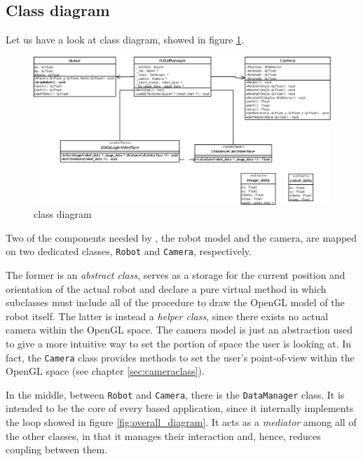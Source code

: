 \subsection{Class diagram}
\label{sec:classdiagram}
%
Let us have a look at \framework{} class diagram, 
showed in figure \ref {fig:class_diagram}.
%
\begin{figure}[!h]
  \begin{center}
    \includegraphics[width=400pt]{img/rear_class_diagram.png}
    \caption{\framework{} class diagram}
    \label{fig:class_diagram}
  \end{center}
\end{figure}
%
Two of the components needed by \framework{}, the robot 
model and the camera, are mapped on two dedicated classes, 
\texttt{Robot} and \texttt{Camera}, respectively.
%

%
The former is an \textit{abstract class}, serves as a storage 
for the current position and orientation of the actual
robot and declare a pure virtual method in which subclasses 
must include all of the procedure to draw the OpenGL model 
of the robot itself.
%
The latter is instead a \textit{helper class}, since there 
exists no actual camera within the OpenGL space. The camera 
model is just an abstraction used to give a more intuitive
way to set the portion of space the user is looking at.
In fact, the \texttt{Camera} class provides methods to 
set the user's point-of-view within the OpenGL space (see
chapter \ref{sec:cameraclass}).
%

%
In the middle, between \texttt{Robot} and \texttt{Camera},
there is the \texttt{DataManager} class. It is intended to be 
the core of every \framework{} based application, since it 
internally implements the loop showed in figure 
\ref{fig:overall_diagram}.
It acts as a \textit{mediator} among all of the other classes, 
in that it manages their interaction and, hence, reduces 
coupling between them.
%

